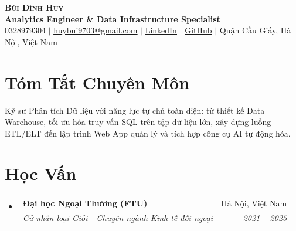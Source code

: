 \documentclass[letterpaper,11pt]{article}
\makeatletter
\newcommand{\resumeSubheading}[4]{
  \vspace{2pt}\item
    \begin{tabular*}{\textwidth}[t]{l@{\extracolsep{\fill}}r}
      \textbf{#1} & #2 \\
      \textit{\small#3} & \textit{\small #4} \\
    \end{tabular*}\vspace{-2pt}
}
\newcommand{\resumeSubHeadingListStart}{\begin{itemize}[leftmargin=0.15in, label={}]}
\newcommand{\resumeSubHeadingListEnd}{\end{itemize}}
\makeatother
\begin{document}
\begin{center}
    \textbf{\Huge \scshape Bùi Đình Huy} \\ \vspace{3pt}
    \small \textbf{\color{NavyBlue} Analytics Engineer \& Data Infrastructure Specialist} \\ \vspace{4pt}
    \small 0328979304 $|$ \href{mailto:huybui9703@gmail.com}{\underline{huybui9703@gmail.com}} $|$ 
    \href{https://www.linkedin.com/in/dinh-huy-bui/}{\underline{LinkedIn}} $|$
    \href{https://github.com/dewey97}{\underline{GitHub}} $|$
    Quận Cầu Giấy, Hà Nội, Việt Nam
\end{center}

\vspace{2pt}

\section*{Tóm Tắt Chuyên Môn}
\small{Kỹ sư Phân tích Dữ liệu với năng lực tự chủ toàn diện: từ thiết kế Data Warehouse, tối ưu hóa truy vấn SQL trên tập dữ liệu lớn, xây dựng luồng ETL/ELT đến lập trình Web App quản lý và tích hợp công cụ AI tự động hóa.}

\section*{Học Vấn}
  \resumeSubHeadingListStart
    \resumeSubheading
      {Đại học Ngoại Thương (FTU)}{Hà Nội, Việt Nam}
      {Cử nhân loại Giỏi - Chuyên ngành Kinh tế đối ngoại}{2021 -- 2025}
  \resumeSubHeadingListEnd

\end{document}
